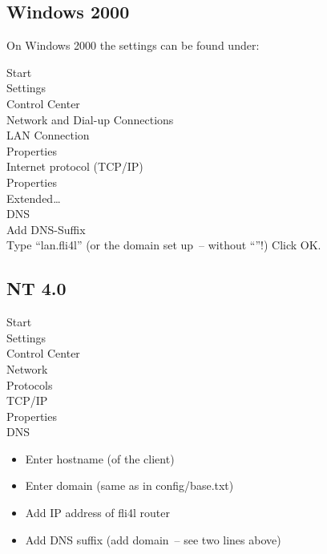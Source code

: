   \subsection{Windows 2000}

  On Windows 2000 the settings can be found under:

  \noindent Start \pfeil\\
  \hspace*{2ex}Settings \pfeil\\
  \hspace*{4ex}Control Center \pfeil\\
  \hspace*{6ex}Network and Dial-up Connections \pfeil\\
  \hspace*{8ex}LAN Connection \pfeil\\
  \hspace*{10ex}Properties \pfeil\\
  \hspace*{12ex}Internet protocol (TCP/IP) \pfeil\\
  \hspace*{14ex}Properties \pfeil\\
  \hspace*{16ex}Extended\ldots \pfeil\\
  \hspace*{18ex}DNS \pfeil\\
  \hspace*{20ex}Add DNS-Suffix \pfeil\\

  Type ``lan.fli4l'' (or the domain set up~-- without ``''!)
  \pfeil Click OK.


\subsection{NT 4.0}

  Start \pfeil\\
  \hspace*{2ex}Settings \pfeil\\
  \hspace*{4ex}Control Center \pfeil\\
  \hspace*{6ex}Network \pfeil\\
  \hspace*{8ex}Protocols \pfeil\\
  \hspace*{10ex}TCP/IP \pfeil\\
  \hspace*{12ex}Properties \pfeil\\
  \hspace*{14ex}DNS \pfeil\\
  \hspace{16ex}\begin{itemize}
  \item Enter hostname (of the client)
  \item Enter domain (same as in config/base.txt)
  \item Add IP address of fli4l router
  \item Add DNS suffix (add domain~-- see two lines above)
  \end{itemize}

